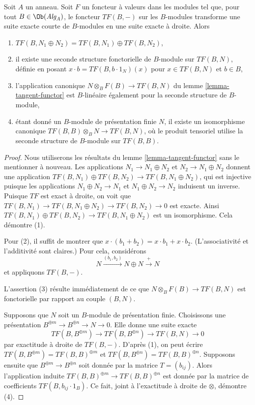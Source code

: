 \begin{lemma}
\label{lemma-exactness-implies}
Soit $A$ un anneau. Soit $F$ un foncteur à valeurs dans les modules
tel que, pour tout $B \in \Ob(\textit{Alg}_A)$, le
foncteur $TF(B, -)$ sur les $B$-modules transforme une suite exacte courte
de $B$-modules en une suite exacte à droite. Alors
\begin{enumerate}
\item $TF(B, N_1 \oplus N_2) = TF(B, N_1) \oplus TF(B, N_2)$,
\item il existe une seconde structure fonctorielle de $B$-module sur $TF(B, N)$,
définie en posant $x \cdot b = TF(B, b\cdot 1_N)(x)$ pour $x \in TF(B, N)$
et $b \in B$,
\item
\label{item-mult-map-linear}
l'application canonique $N \otimes_B F(B) \to TF(B, N)$ du
lemme \ref{lemma-tangent-functor}
est $B$-linéaire également pour la seconde structure de $B$-module,
\item
\label{item-tangent-right-exact}
étant donné un $B$-module de présentation finie $N$, il existe un
isomorphisme canonique $TF(B, B) \otimes_B N \to TF(B, N)$, où le produit
tensoriel utilise la seconde structure de $B$-module sur $TF(B, B)$.
\end{enumerate}
\end{lemma}

\begin{proof}
Nous utiliserons les résultats du
lemme \ref{lemma-tangent-functor}
sans le mentionner à nouveau.
Les applications $N_1 \to N_1 \oplus N_2$ et $N_2 \to N_1 \oplus N_2$ donnent
une application $TF(B, N_1) \oplus TF(B, N_2) \to TF(B, N_1 \oplus N_2)$,
qui est injective puisque les applications $N_1 \oplus N_2 \to N_1$ et
$N_1 \oplus N_2 \to N_2$ induisent un inverse.
Puisque $TF$ est exact à droite, on voit que
$TF(B, N_1) \to TF(B, N_1 \oplus N_2) \to TF(B, N_2) \to 0$ est exacte.
Ainsi $TF(B, N_1) \oplus TF(B, N_2) \to TF(B, N_1 \oplus N_2)$ est un
isomorphisme. Cela démontre (1).

\medskip\noindent
Pour (2), il suffit de montrer que
$x \cdot (b_1 + b_2) = x \cdot b_1 + x \cdot b_2$.
(L'associativité et l'additivité sont claires.) Pour cela, considérons
$$
N \xrightarrow{(b_1, b_2)} N \oplus N \xrightarrow{+} N
$$
et appliquons $TF(B, -)$.

\medskip\noindent
L'assertion (3) résulte immédiatement de ce que
$N \otimes_B F(B) \to TF(B, N)$ est fonctorielle par rapport au couple $(B, N)$.

\medskip\noindent
Supposons que $N$ soit un $B$-module de présentation finie. Choisissons une présentation
$B^{\oplus m} \to B^{\oplus n} \to N \to 0$. Elle donne une suite
exacte
$$
TF(B, B^{\oplus m}) \to TF(B, B^{\oplus n}) \to TF(B, N) \to 0
$$
par exactitude à droite de $TF(B, -)$. D'après (1), on peut écrire
$TF(B, B^{\oplus m}) = TF(B, B)^{\oplus m}$ et
$TF(B, B^{\oplus n}) = TF(B, B)^{\oplus n}$. Supposons ensuite que
$B^{\oplus m} \to B^{\oplus n}$ soit donnée par la matrice $T = (b_{ij})$.
Alors l'application induite $TF(B, B)^{\oplus m} \to TF(B, B)^{\oplus n}$
est donnée par la matrice de coefficients $TF(B, b_{ij} \cdot 1_B)$.
Ce fait, joint à l'exactitude à droite de $\otimes$, démontre (4).
\end{proof}

